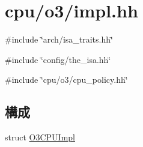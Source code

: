\hypertarget{impl_8hh}{
\section{cpu/o3/impl.hh}
\label{impl_8hh}
}
{\ttfamily \#include \char`\"{}arch/isa\_\-traits.hh\char`\"{}}\par
{\ttfamily \#include \char`\"{}config/the\_\-isa.hh\char`\"{}}\par
{\ttfamily \#include \char`\"{}cpu/o3/cpu\_\-policy.hh\char`\"{}}\par
\subsection*{構成}
\begin{DoxyCompactItemize}
\item 
struct \hyperlink{structO3CPUImpl}{O3CPUImpl}
\end{DoxyCompactItemize}
